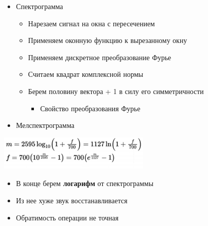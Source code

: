 \documentclass[a4paper, 12pt]{article}
\begin{document}
\begin{itemize}
\item
  
  {Спектрограмма}
  

  \begin{itemize}
  \item
    
    Нарезаем сигнал на окна с пересечением
    
  \item
    
    Применяем оконную функцию к вырезанному окну
    
  \item
    
    Применяем дискретное преобразование Фурье
    
  \item
    
    Считаем квадрат комплексной нормы
    
  \item
    
    Берем половину вектора + 1 в силу его симметричности
    

    \begin{itemize}
    \item
      
      Свойство преобразования Фурье
      
    \end{itemize}
  \end{itemize}
\item
  
  {Мелспектрограмма}
  
\end{itemize}


\includegraphics[width=2.86827in,height=0.65760in]{media/image22.png}


\begin{itemize}
\item
  
  В конце берем \textbf{логарифм} от спектрограммы
  
\item
  
  Из нее хуже звук восстанавливается
  
\item
  
  Обратимость операции не точная
  
\end{itemize}
\end{document}

